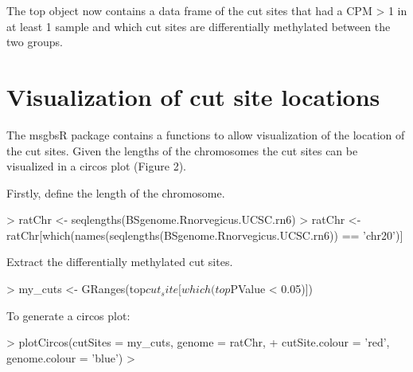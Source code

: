 \documentclass{article}
\begin{document}
The top object now contains a data frame of the cut sites that had a CPM > 1 in at least 1 sample and which cut sites are differentially methylated between the two groups.

\section{Visualization of cut site locations}

The msgbsR package contains a functions to allow visualization of the location of the cut sites. Given the lengths of the chromosomes the cut sites can be visualized in a circos plot (Figure 2).

Firstly, define the length of the chromosome.
\begin{Schunk}
\begin{Sinput}
> ratChr <- seqlengths(BSgenome.Rnorvegicus.UCSC.rn6)
> ratChr <- ratChr[which(names(seqlengths(BSgenome.Rnorvegicus.UCSC.rn6)) == 'chr20')]
\end{Sinput}
\end{Schunk}

Extract the differentially methylated cut sites.
\begin{Schunk}
\begin{Sinput}
> my_cuts <- GRanges(top$cut_site[which(top$PValue < 0.05)])
\end{Sinput}
\end{Schunk}

To generate a circos plot:
\begin{Schunk}
\begin{Sinput}
> plotCircos(cutSites = my_cuts, genome = ratChr,
+            cutSite.colour = 'red', genome.colour = 'blue')
> 
\end{Sinput}
\end{Schunk}
\end{document}
